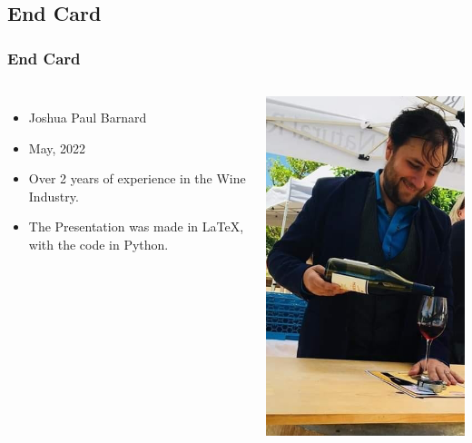 \documentclass{beamer}
\begin{document}
	\subsection{End Card}
	\begin{frame}
		\frametitle{End Card}	
			\begin{columns}
			\vspace{-25pt}
			\begin{itemize}
				\item Joshua Paul Barnard
				\item May, 2022
				\item Over 2 years of experience in the Wine Industry.
				\item The Presentation was made in \LaTeX, with the code in Python.
			\end{itemize}
				\includegraphics[width=.9\textwidth]{images/shone farm wine pouring - vert.png}
		\end{columns}
	\end{frame}
	
	
	
\end{document}

